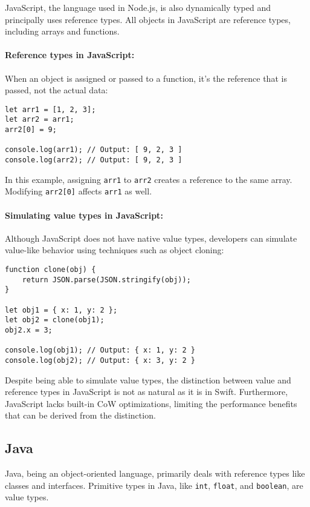 JavaScript, the language used in Node.js, is also dynamically typed and principally uses reference types. All objects in JavaScript are reference types, including arrays and functions.

\paragraph{Reference types in JavaScript:}
When an object is assigned or passed to a function, it's the reference that is passed, not the actual data:

\begin{verbatim}
let arr1 = [1, 2, 3];
let arr2 = arr1;
arr2[0] = 9;

console.log(arr1); // Output: [ 9, 2, 3 ]
console.log(arr2); // Output: [ 9, 2, 3 ]
\end{verbatim}

In this example, assigning \texttt{arr1} to \texttt{arr2} creates a reference to the same array. Modifying \texttt{arr2[0]} affects \texttt{arr1} as well.

\paragraph{Simulating value types in JavaScript:}
Although JavaScript does not have native value types, developers can simulate value-like behavior using techniques such as object cloning:

\begin{verbatim}
function clone(obj) {
    return JSON.parse(JSON.stringify(obj));
}

let obj1 = { x: 1, y: 2 };
let obj2 = clone(obj1);
obj2.x = 3;

console.log(obj1); // Output: { x: 1, y: 2 }
console.log(obj2); // Output: { x: 3, y: 2 }
\end{verbatim}

Despite being able to simulate value types, the distinction between value and reference types in JavaScript is not as natural as it is in Swift. Furthermore, JavaScript lacks built-in CoW optimizations, limiting the performance benefits that can be derived from the distinction.

\subsection{Java}

Java, being an object-oriented language, primarily deals with reference types like classes and interfaces. Primitive types in Java, like \texttt{int}, \texttt{float}, and \texttt{boolean}, are value types.

